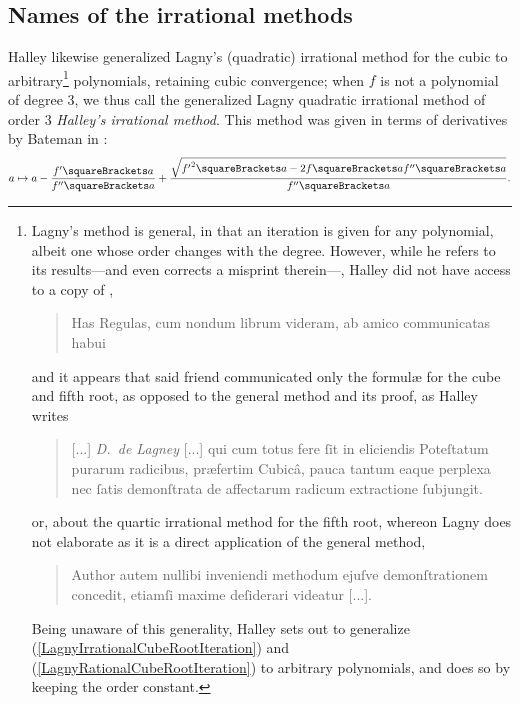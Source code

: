 ﻿\documentclass[10pt, a4paper, twoside]{basestyle}
\begin{document}
\subsection*{Names of the irrational methods}
Halley likewise generalized Lagny's (quadratic) irrational method for the cubic to
arbitrary\footnote{Lagny's method is general, in that an iteration is given for any
polynomial, albeit one whose order changes with the degree. However, while he refers to its
results---and even corrects a misprint therein---, Halley
did not have access to a copy of \cite{FantetdeLagny1692},
\begin{quote}
Has Regulas, cum nondum librum videram, ab amico communicatas habui
\end{quote}
and it appears that said friend communicated only the formulæ for the cube and fifth root, as opposed to the
general method and its proof, as Halley writes
\begin{quote}
[...] \emph{D.~de Lagney} [...] qui cum totus fere ſit in eliciendis Poteſtatum purarum radicibus,
præfertim Cubicâ, pauca tantum eaque perplexa nec ſatis demonſtrata de affectarum radicum
extractione ſubjungit.
\end{quote}
or, about the quartic irrational method for the fifth root, whereon Lagny does not elaborate as
it is a direct application of the general method,
\begin{quote}
Author autem nullibi inveniendi methodum ejuſve demonſtrationem concedit,
etiamſi maxime deſiderari videatur [...].
\end{quote}
Being unaware of this generality, Halley sets out to generalize (\ref{LagnyIrrationalCubeRootIteration}) and (\ref{LagnyRationalCubeRootIteration}) to
arbitrary polynomials, and does so by keeping the order constant.}
polynomials, retaining cubic convergence; when $f$ is
not a polynomial of degree $3$, we thus call the generalized Lagny quadratic irrational method of
order $3$ \emph{Halley's irrational method}.
This method was given in terms of derivatives by Bateman in \cite[12]{Bateman1938}:\[
\FunctionBody{a}{a-\frac{f'\of{a}}}{f''\of{a}}+\frac{\sqrt{{f'}^2\of{a}-2f\of{a}f''\of{a}}}{f''\of{a}}\text.
\]
\end{document}
